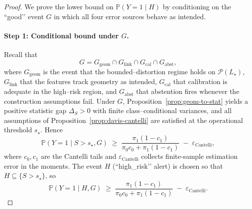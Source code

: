 \documentclass[11pt]{article}
\begin{document}
\begin{proof}
We prove the lower bound on $\mathbb{P}(Y=1 \mid H)$ by conditioning on the
“good’’ event $G$ in which all four error sources behave as intended.

\paragraph{Step 1: Conditional bound under $G$.}
Recall that
\[
G
=
G_{\mathrm{geom}} \cap G_{\mathrm{link}} \cap G_{\mathrm{cal}} \cap G_{\mathrm{abst}},
\]
where $G_{\mathrm{geom}}$ is the event that the bounded–distortion regime holds on
$\mathcal{P}(L_\star)$, $G_{\mathrm{link}}$ that the features track geometry as intended,
$G_{\mathrm{cal}}$ that calibration is adequate in the high–risk region, and
$G_{\mathrm{abst}}$ that abstention fires whenever the construction assumptions fail.
Under $G$, Proposition~\ref{prop:geom-to-stat} yields a positive statistic gap
$\Delta_S > 0$ with finite class–conditional variances, and all assumptions of
Proposition~\ref{prop:davis-cantelli} are satisfied at the operational threshold
$s_\star$. Hence
\begin{equation}
\mathbb{P}(Y = 1 \mid S > s_\star, G)
\;\ge\;
\frac{\pi_1(1 - c_1)}{\pi_0 c_0 + \pi_1(1 - c_1)}
\;-\; \varepsilon_{\mathrm{Cantelli}},
\label{eq:a7-step1}
\end{equation}
where $c_0, c_1$ are the Cantelli tails and $\varepsilon_{\mathrm{Cantelli}}$ collects
finite-sample estimation error in the moments. The event $H$ (“high\_risk’’ alert)
is chosen so that $H \subseteq \{S > s_\star\}$, so
\begin{equation}
\mathbb{P}(Y = 1 \mid H, G)
\;\ge\;
\frac{\pi_1(1 - c_1)}{\pi_0 c_0 + \pi_1(1 - c_1)}
\;-\; \varepsilon_{\mathrm{Cantelli}}.
\label{eq:a7-step1b}
\end{equation}


\end{proof}
\end{document}
